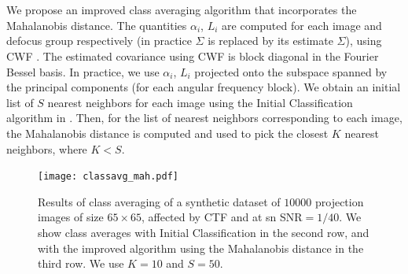 \documentclass{article}
\begin{document}
We propose an improved class averaging algorithm that incorporates the Mahalanobis distance. The quantities $\alpha_i$, $L_i$ are computed for each image and defocus group respectively (in practice $\Sigma$ is replaced by its estimate $\hat{\Sigma}$), using CWF \cite{cwf}. The estimated covariance using CWF is block diagonal in the Fourier Bessel basis. In practice, we use $\alpha_i$, $L_i$ projected onto the subspace spanned by the principal components (for each angular frequency block). We obtain an initial list of $S$ nearest neighbors for each image using the Initial Classification algorithm in \cite{zhao}. Then, for the list of nearest neighbors corresponding to each image, the Mahalanobis distance is computed and used to pick the closest $K$ nearest neighbors, where $K<S$. 
%

\begin{figure}[!htbp]
\begin{center}
\texttt{[image: classavg\_mah.pdf]}
\end{center}
\vspace{-.15in}
\caption{Results of class averaging of a synthetic dataset of $10000$ projection images of size $65 \times 65$, affected by CTF and at sn SNR$=1/40$. We show class averages with Initial Classification in the second row, and with the improved algorithm using the Mahalanobis distance in the third row. We use $K=10$ and $S=50$.}
\vspace{-.25in}
\label{fig:classavg}
\end{figure}
\end{document}
